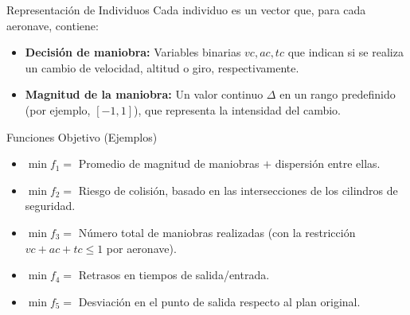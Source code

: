 \begin{frame}{\parencite{mateos_multiobjective_2016} }{}
    \begin{block}{Representación de Individuos}
        Cada individuo es un vector que, para cada aeronave, contiene:
        \begin{itemize}
            \item \textbf{Decisión de maniobra:} Variables binarias \(vc, ac, tc\) que indican si se realiza un cambio de velocidad, altitud o giro, respectivamente.
            \item \textbf{Magnitud de la maniobra:} Un valor continuo \(\Delta\) en un rango predefinido (por ejemplo, \([-1,1]\)), que representa la intensidad del cambio.
        \end{itemize}
    \end{block}
    \begin{block}{Funciones Objetivo (Ejemplos)}
        \begin{itemize}
            \item \(\min f_1 =\) Promedio de magnitud de maniobras \(+\) dispersión entre ellas.
            \item \(\min f_2 =\) Riesgo de colisión, basado en las intersecciones de los cilindros de seguridad.
            \item \(\min f_3 =\) Número total de maniobras realizadas (con la restricción \(vc+ac+tc \leq 1\) por aeronave).
            \item \(\min f_4 =\) Retrasos en tiempos de salida/entrada.
            \item \(\min f_5 =\) Desviación en el punto de salida respecto al plan original.
        \end{itemize}
    \end{block}
\end{frame}


